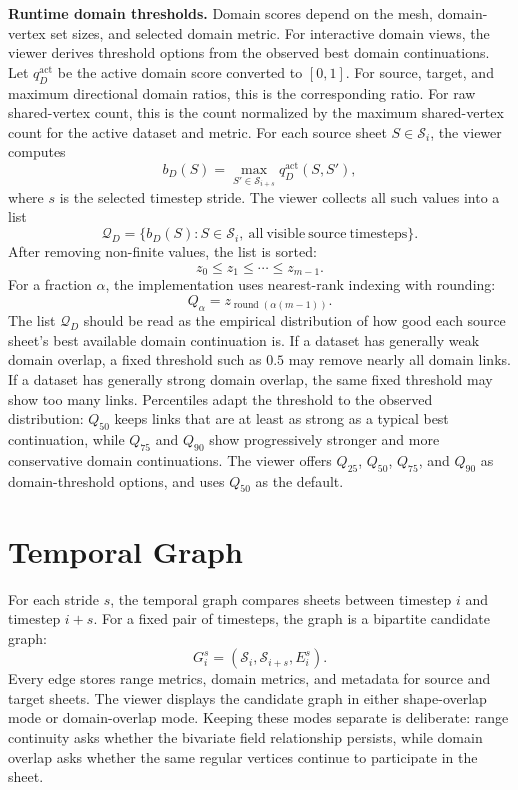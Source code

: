 \documentclass{vgtc}
\newcommand{\Sheets}{\mathcal{S}}
\newcommand{\Sheet}{S}
\newcommand{\myparagraph}[1]{\vspace{1mm} \noindent \textbf{#1}}
\begin{document}
\myparagraph{Runtime domain thresholds.}
Domain scores depend on the mesh, domain-vertex set sizes, and selected domain metric. For interactive domain views, the viewer derives threshold options from the observed best domain continuations. Let $q_D^\mathrm{act}$ be the active domain score converted to $[0,1]$. For source, target, and maximum directional domain ratios, this is the corresponding ratio. For raw shared-vertex count, this is the count normalized by the maximum shared-vertex count for the active dataset and metric. For each source sheet $\Sheet\in\Sheets_i$, the viewer computes
$$
b_D(\Sheet)=\max_{\Sheet'\in\Sheets_{i+s}}q_D^\mathrm{act}(\Sheet,\Sheet'),
$$
where $s$ is the selected timestep stride. The viewer collects all such values into a list
$$
\mathcal{Q}_D=\{b_D(\Sheet):\Sheet\in\Sheets_i,\ \mathrm{all\ visible\ source\ timesteps}\}.
$$
After removing non-finite values, the list is sorted:
$$
z_0\leq z_1\leq\cdots\leq z_{m-1}.
$$
For a fraction $\alpha$, the implementation uses nearest-rank indexing with rounding:
$$
Q_\alpha=z_{\operatorname{round}(\alpha(m-1))}.
$$
The list $\mathcal{Q}_D$ should be read as the empirical distribution of how good each source sheet's best available domain continuation is. If a dataset has generally weak domain overlap, a fixed threshold such as $0.5$ may remove nearly all domain links. If a dataset has generally strong domain overlap, the same fixed threshold may show too many links. Percentiles adapt the threshold to the observed distribution: $Q_{50}$ keeps links that are at least as strong as a typical best continuation, while $Q_{75}$ and $Q_{90}$ show progressively stronger and more conservative domain continuations. The viewer offers $Q_{25}$, $Q_{50}$, $Q_{75}$, and $Q_{90}$ as domain-threshold options, and uses $Q_{50}$ as the default.

\section{Temporal Graph}

For each stride $s$, the temporal graph compares sheets between timestep $i$ and timestep $i+s$. For a fixed pair of timesteps, the graph is a bipartite candidate graph:
$$
G_i^s=(\Sheets_i,\Sheets_{i+s},E_i^s).
$$
Every edge stores range metrics, domain metrics, and metadata for source and target sheets. The viewer displays the candidate graph in either shape-overlap mode or domain-overlap mode. Keeping these modes separate is deliberate: range continuity asks whether the bivariate field relationship persists, while domain overlap asks whether the same regular vertices continue to participate in the sheet.
\end{document}

